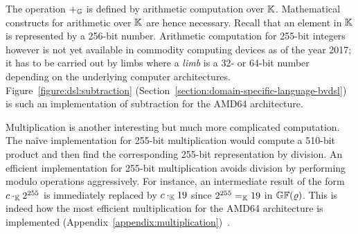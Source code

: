 
The operation $+_{\mathbb{G}}$ is defined by arithmetic computation over
$\mathbb{K}$. %
Mathematical constructs for
arithmetic over $\mathbb{K}$ are hence necessary. Recall that
an element in $\mathbb{K}$ is represented by a 256-bit number. 
Arithmetic computation for 255-bit integers however is not yet
available in commodity computing devices as of the year
2017; it has to be carried out by limbs where a
\emph{limb} is a 32- or 64-bit number depending on the underlying
computer architectures. Figure~\ref{figure:dsl:subtraction}
(Section~\ref{section:domain-specific-language-bvdsl}) is such an
implementation of subtraction for the AMD64 architecture. 



Multiplication is another interesting but much more
complicated computation. The na\"ive implementation for 255-bit
multiplication would compute a 510-bit product and then find the
corresponding 255-bit representation by division. 
An efficient implementation for 255-bit multiplication avoids
division by performing modulo operations aggressively. 
For instance, an intermediate
result of the form $c \cdot_{\mathbb{K}} 2^{255}$ is immediately replaced by
$c \cdot_{\mathbb{K}} 19$ since $2^{255} =_{\mathbb{K}} 19$ in $\mathbb{GF}(\varrho)$. 
This is indeed how the most efficient multiplication for the AMD64
architecture is implemented (Appendix~\ref{appendix:multiplication})~\cite{BDL+:11:HSHSS,BDL+:12:HSHSS}.


